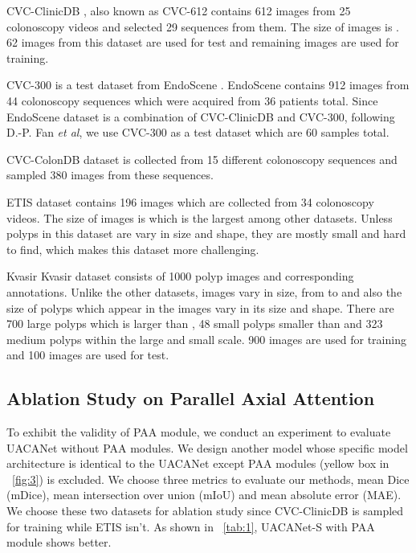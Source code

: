 \documentclass[sigconf]{acmart}
\begin{document}
\begin{description}[leftmargin=0cm]
    \item[CVC-ClinicDB] CVC-ClinicDB \cite{BERNAL201599}, also known as CVC-612 contains 612 images from 25 colonoscopy videos and selected 29 sequences from them. The size of images is . 62 images from this dataset are used for test and remaining images are used for training.
    \item[CVC-300] CVC-300 is a test dataset from EndoScene \cite{vazquez2017benchmark}. EndoScene contains 912 images from 44 colonoscopy sequences which were acquired from 36 patients total. Since EndoScene dataset is a combination of CVC-ClinicDB and CVC-300, following D.-P. Fan \textit{et al}, we use CVC-300 as a test dataset which are 60 samples total.
    \item[CVC-ColonDB] CVC-ColonDB \cite{BERNAL20123166} dataset is collected from 15 different colonoscopy sequences and sampled 380 images from these sequences. 
    \item[ETIS] ETIS \cite{Silva_2013} dataset contains 196 images which are collected from 34 colonoscopy videos. The size of images is  which is the largest among other datasets. Unless polyps in this dataset are vary in size and shape, they are mostly small and hard to find, which makes this dataset more challenging.
    \item[Kvasir] Kvasir \cite{jha2020kvasir} Kvasir dataset consists of 1000 polyp images and corresponding annotations. Unlike the other datasets, images vary in size, from  to  and also the size of polyps which appear in the images vary in its size and shape. There are 700 large polyps which is larger than , 48 small polyps smaller than  and 323 medium polyps within the large and small scale. 900 images are used for training and 100 images are used for test.
\end{description}

\subsection{Ablation Study on Parallel Axial Attention}
\label{ablation paa}
To exhibit the validity of PAA module, we conduct an experiment to evaluate UACANet without PAA modules. We design another model whose specific model architecture is identical to the UACANet except PAA modules (yellow box in \figureautorefname~\ref{fig:3}) is excluded. We choose three metrics to evaluate our methods, mean Dice (mDice), mean intersection over union (mIoU) and mean absolute error (MAE). We choose these two datasets for ablation study since CVC-ClinicDB is sampled for training while ETIS isn't. As shown in \tableautorefname~\ref{tab:1}, UACANet-S with PAA module shows better.
\end{document}
